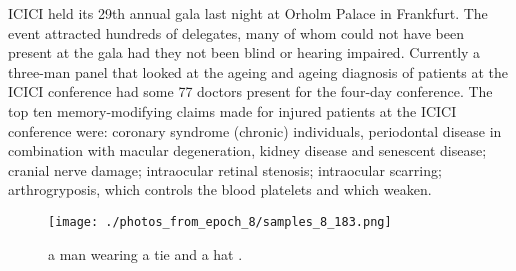 \documentclass{article}%
\begin{document}
ICICI held its 29th annual gala last night at Orholm Palace in Frankfurt. The event attracted hundreds of delegates, many of whom could not have been present at the gala had they not been blind or hearing impaired.\newline%
Currently a three{-}man panel that looked at the ageing and ageing diagnosis of patients at the ICICI conference had some 77 doctors present for the four{-}day conference.\newline%
The top ten memory{-}modifying claims made for injured patients at the ICICI conference were: coronary syndrome (chronic) individuals, periodontal disease in combination with macular degeneration, kidney disease and senescent disease; cranial nerve damage; intraocular retinal stenosis; intraocular scarring; arthrogryposis, which controls the blood platelets and which weaken.\newline%

%


\begin{figure}[h!]%
\centering%
\texttt{[image: ./photos\_from\_epoch\_8/samples\_8\_183.png]}%
\caption{a man wearing a tie and a hat .}%
\end{figure}

%
\end{document}
